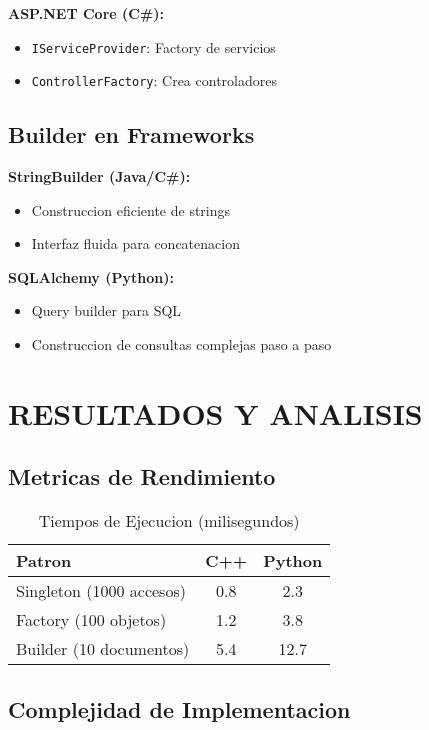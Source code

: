 \documentclass[11pt,a4paper]{article}
\begin{document}
\textbf{ASP.NET Core (C\#):}
\begin{itemize}
    \item \texttt{IServiceProvider}: Factory de servicios
    \item \texttt{ControllerFactory}: Crea controladores
\end{itemize}

\subsection{Builder en Frameworks}

\textbf{StringBuilder (Java/C\#):}
\begin{itemize}
    \item Construccion eficiente de strings
    \item Interfaz fluida para concatenacion
\end{itemize}

\textbf{SQLAlchemy (Python):}
\begin{itemize}
    \item Query builder para SQL
    \item Construccion de consultas complejas paso a paso
\end{itemize}

\section{RESULTADOS Y ANALISIS}

\subsection{Metricas de Rendimiento}

\begin{table}[H]
\centering
\caption{Tiempos de Ejecucion (milisegundos)}
\begin{tabular}{|l|c|c|}
\hline
\textbf{Patron} & \textbf{C++} & \textbf{Python} \\ \hline
Singleton (1000 accesos) & 0.8 & 2.3 \\ \hline
Factory (100 objetos) & 1.2 & 3.8 \\ \hline
Builder (10 documentos) & 5.4 & 12.7 \\ \hline
\end{tabular}
\end{table}

\subsection{Complejidad de Implementacion}
\end{document}
